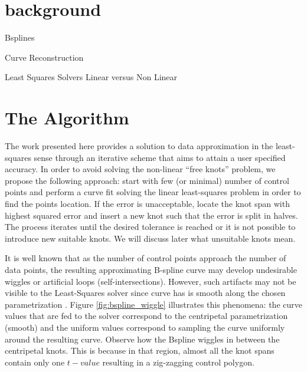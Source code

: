 \documentclass[a4paper,12pt]{article}
\begin{document}
 
 \section{background}
 Bsplines
 
 Curve Reconstruction
 
 Least Squares Solvers
 Linear versus Non Linear
 
 
 \section{The Algorithm}
 
 The work presented here provides a solution to data approximation in the least-squares sense through an iterative 
 scheme that aims to attain a user specified accuracy. 
In order to avoid solving the non-linear ``free knots'' problem, we propose the following approach: start with few (or minimal) number of control points and perform a curve fit solving the linear least-squares problem in order to find 
the points location. If the error is unacceptable, locate the knot span with highest squared error and insert a  new knot such that the error is split in halves. The process iterates until the desired tolerance is reached or it is not 
possible to introduce new suitable knots. We will discuss later what unsuitable knots mean. 

It is well known that as the number of control points approach the number of data points, 
the resulting approximating B-spline curve may develop undesirable wiggles or artificial loops (self-intersections). 
However, such artifacts may not be visible to the Least-Squares solver since curve has is smooth along the chosen parametrization 
. Figure \ref{fig:bspline_wiggle} illustrates this phenomena: the curve values that 
 are fed to the solver correspond to the centripetal parametrization (smooth) and the uniform values correspond to 
 sampling the curve uniformly around the resulting curve. 
 Observe how the Bspline wiggles in between the centripetal knots. This is because in that region, almost all the 
 knot spans contain only one $t-value$ resulting in a zig-zagging control polygon.
 
\end{document}
